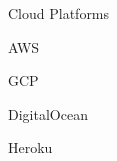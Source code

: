 \begin{skillset}{Cloud Platforms}
  \item AWS
  \item GCP
  \item DigitalOcean
  \item Heroku
\end{skillset}
